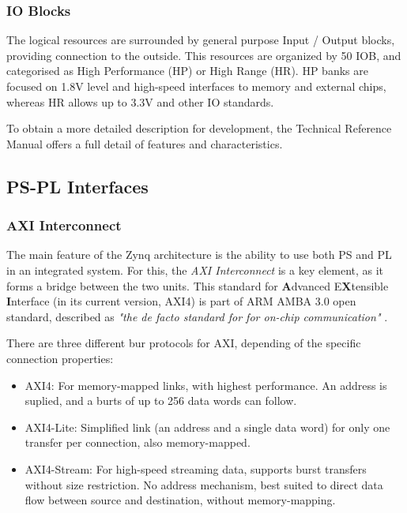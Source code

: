 \subsubsection{IO Blocks}

The logical resources are surrounded by general purpose Input / Output blocks, providing connection
to the outside. This resources are organized by 50 IOB, and categorised as High Performance (HP) or
High Range (HR). HP banks are focused on 1.8V level and high-speed interfaces to memory and external
chips, whereas HR allows up to 3.3V and other IO standards.

To obtain a more detailed description for development, the Technical Reference Manual
\cite[p.~38]{UG585} offers a full detail of features and characteristics.

\subsection{PS-PL Interfaces}

\subsubsection*{AXI Interconnect}

The main feature of the Zynq architecture is the ability to use both PS and PL in an integrated
system. For this, the \textit{AXI Interconnect} is a key element, as it forms a bridge between the
two units. This standard for \textbf{A}dvanced E\textbf{X}tensible \textbf{I}nterface (in its
current version, AXI4) is part of ARM AMBA 3.0 open standard, described as \textit{"the de facto
standard for for on-chip communication"} \cite{Crokett2014}.

There are three different bur protocols for AXI, depending of the specific connection properties:

\begin{itemize}
	\item AXI4: For memory-mapped links, with highest performance. An address is suplied, and a
	burts of up to 256 data words can follow.
	\item AXI4-Lite: Simplified link (an address and a single data word) for only one transfer per
	connection, also memory-mapped.
	\item AXI4-Stream: For high-speed streaming data, supports burst transfers without size
	restriction. No address mechanism, best suited to direct data flow between source and
	destination, without memory-mapping.
\end{itemize}

